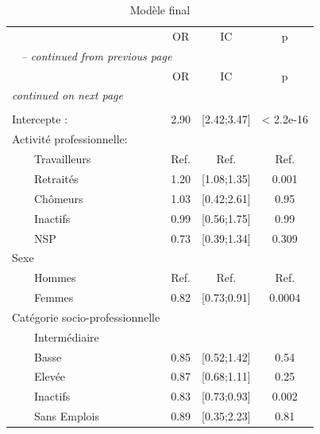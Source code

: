 \documentclass{book}
\begin{document}
    \begin{longtable}{lccc}\caption{Modèle final}\\
    \hline  
     &                \multirow{2}{*}{OR}    & \multirow{2}{*}{IC} & \multirow{2}{*}{p}\\ 
 &     &                        &         \\ 
  
    \hline
    \hline     
    \endfirsthead 
    \multicolumn{4}{l}{\tablename\ \thetable{} \textit{-- continued from previous page}}\\ 
    \hline
    &                     \multirow{2}{*}{OR}    & \multirow{2}{*}{IC} & \multirow{2}{*}{p}\\ 
 &     &                     &         \\ 

    \hline
    \hline  
    \endhead   
    \hline
    \multicolumn{4}{l}{\textit{continued on next page}} \\ 
    \endfoot   
    \multicolumn{4}{l}{}  \\ 
    \endlastfoot

Intercepte : &2.90 & [2.42;3.47] &< 2.2e-16 \\    
Activité professionnelle:  &         &              &                         \\ 
$\qquad$Travailleurs & Ref.& Ref. & Ref.             \\ 
$\qquad$Retraités &1.20&[1.08;1.35] &0.001\\
$\qquad$Chômeurs   & 1.03& [0.42;2.61]& 0.95\\ 
$\qquad$Inactifs &0.99& [0.56;1.75] &0.99\\
$\qquad$NSP  &0.73&[0.39;1.34] &0.309\\ 

Sexe&&&\\
$\qquad$Hommes & Ref.& Ref. & Ref.             \\
$\qquad$Femmes &0.82 &[0.73;0.91] &0.0004\\
 
Catégorie socio-professionnelle&&&\\
$\qquad$Intermédiaire&&&\\
$\qquad$Basse &0.85& [0.52;1.42] &0.54\\ 
$\qquad$Elevée &0.87& [0.68;1.11] &0.25\\ 
$\qquad$Inactifs   &0.83& [0.73;0.93] &0.002\\
$\qquad$Sans Emplois &0.89 &[0.35;2.23] &0.81\\


\end{longtable}
\end{document}
